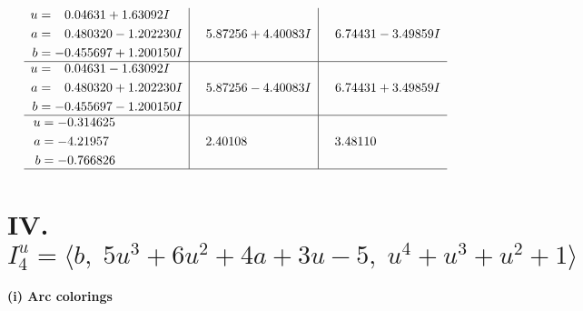 \documentclass[1p]{elsarticle_modified}
\theoremstyle{definition}
\begin{document}
$$\begin{array}{c|c|c}
\begin{aligned}
u &= \phantom{-}0.04631 + 1.63092 I \\
a &= \phantom{-}0.480320 - 1.202230 I \\
b &= -0.455697 + 1.200150 I\end{aligned}
 & \phantom{-}5.87256 + 4.40083 I & \phantom{-}6.74431 - 3.49859 I \\ \hline\begin{aligned}
u &= \phantom{-}0.04631 - 1.63092 I \\
a &= \phantom{-}0.480320 + 1.202230 I \\
b &= -0.455697 - 1.200150 I\end{aligned}
 & \phantom{-}5.87256 - 4.40083 I & \phantom{-}6.74431 + 3.49859 I \\ \hline\begin{aligned}
u &= -0.314625\phantom{ +0.000000I} \\
a &= -4.21957\phantom{ +0.000000I} \\
b &= -0.766826\phantom{ +0.000000I}\end{aligned}
 & \phantom{-}2.40108\phantom{ +0.000000I} & \phantom{-}3.48110\phantom{ +0.000000I}\\
 \hline 
 \end{array}$$\newpage\newpage\renewcommand{\arraystretch}{1}
\centering \section*{IV. $I^u_{4}= \langle b,\;5 u^3+6 u^2+4 a+3 u-5,\;u^4+u^3+u^2+1 \rangle$}
\flushleft \textbf{(i) Arc colorings}\\
\end{document}
